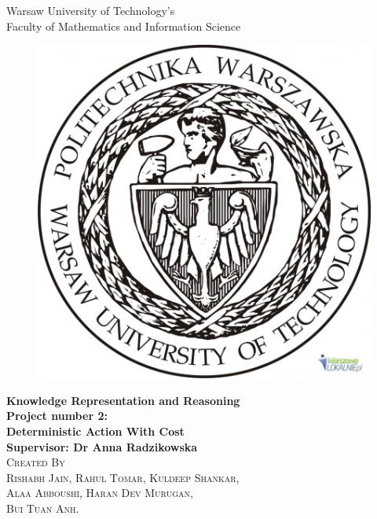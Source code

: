 \documentclass[11pt]{article}
\begin{document}
	\begin{titlepage}
		\begin{center}
			\Large{Warsaw University of Technology's}\\
			\Large{Faculty of Mathematics and Information Science}\\
			[0.3in]
			\begin{figure}[H]
				\centering
				\includegraphics[width=0.4\linewidth, height=0.25\textheight]{./media/uni_logo.jpeg}
				\label{Figure:f04}
			\end{figure}
			\Large{\bfseries Knowledge Representation and Reasoning}\\
			[0.3in]
			\Large{\bfseries Project number 2:}\\
			\Large{\bfseries Deterministic Action With Cost}\\
			\Large{\bfseries Supervisor: Dr Anna Radzikowska}\\
			[0.3in]
			\textsc{\Large{Created By}\\
				Rishabh Jain,
				Rahul Tomar,
				Kuldeep Shankar,\\ 
				Alaa Abboushi,
				Haran Dev Murugan,\\
				Bui Tuan Anh.\\}
		\end{center}	
	\end{titlepage}
	\tableofcontents
	\newpage
\end{document}
